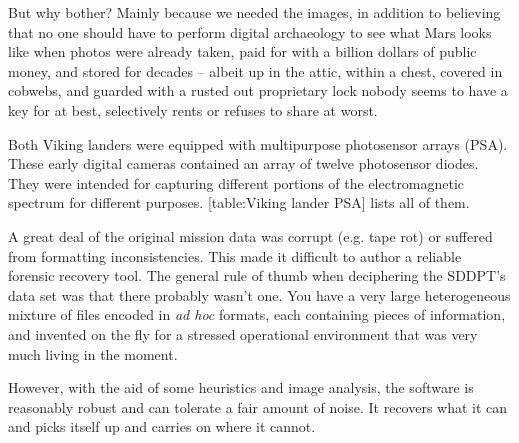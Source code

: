 But why bother? Mainly because we needed the images, in addition to believing that no one should have to perform digital archaeology to see what Mars looks like when photos were already taken, paid for with a billion dollars of public money, and stored for decades -- albeit up in the attic, within a chest, covered in cobwebs, and guarded with a rusted out proprietary lock nobody seems to have a key for at best, selectively rents or refuses to share at worst.


Both Viking landers were equipped with multipurpose photosensor arrays (PSA). These early digital cameras contained an array of twelve photosensor diodes. They were intended for capturing different portions of the electromagnetic spectrum for different purposes. [table:Viking lander PSA] lists all of them.

A great deal of the original mission data was corrupt (e.g. tape rot) or suffered from formatting inconsistencies. This made it difficult to author a reliable forensic recovery tool. The general rule of thumb when deciphering the SDDPT's data set was that there probably wasn't one. You have a very large heterogeneous mixture of files encoded in {\it ad hoc} formats, each containing pieces of information, and invented on the fly for a stressed operational environment that was very much living in the moment. 

However, with the aid of some heuristics and image analysis, the software is reasonably robust and can tolerate a fair amount of noise. It recovers what it can and picks itself up and carries on where it cannot.

